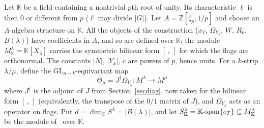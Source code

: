 \documentclass[11pt, letterpaper]{amsart}
\let\amstext\text
\renewcommand{\text}[1]{\amstext{\upshape #1}}%
\theoremstyle{definition}
\theoremstyle{remark}
\newcommand{\KK}{\mathbb{K}}
\newcommand{\CC}{\mathbb{C}}
\newcommand{\ZZ}{\mathbb{Z}}
\newcommand{\GL}{\mathrm{GL}}
\begin{document}
Let $\KK$ be a field containing a nontrivial $p$th root of unity. Its characteristic $\ell$ is then $0$ or different from $p$ ($\ell$ may divide $|G|$). Let $A=\ZZ[\zeta_p,1/p]$ and choose an $A$-algebra structure on $\KK$. All the objects of the construction ($x_T$, $\Omega_{Y_k}$, $W$, $R_k$, $B(\lambda)$) have coefficients in $A$, and so are defined over $\KK$; the module $M^\lambda_\KK=\KK[X_\lambda]$ carries the symmetric bilinear form $[\,,\,]$ for which the flags are orthonormal. The constants $|N|$, $|Y_k|$, $c$ are powers of $p$, hence units. For a $k$-strip $\lambda/\mu$, define the $\GL_{n-k}$-equivariant map
\[
\Theta_\mu=J^\dagger \Omega_{Y_k}\colon M^\lambda\to M^\mu
\]
where $J^\dagger$ is the adjoint of $J$ from Section~\ref{secdiag}, now taken for the bilinear form $[\,,\,]$ (equivalently, the transpose of the $0/1$ matrix of $J$), and $\Omega_{Y_k}$ acts as an operator on flags. Put $d=\dim_\CC S^\lambda=|B(\lambda)|$, and let $S^\lambda_\KK=\KK\text{-span}\{e_T\}\subseteq M^\lambda_\KK$ be the module of~\cite{AN2} over $\KK$.
\end{document}
